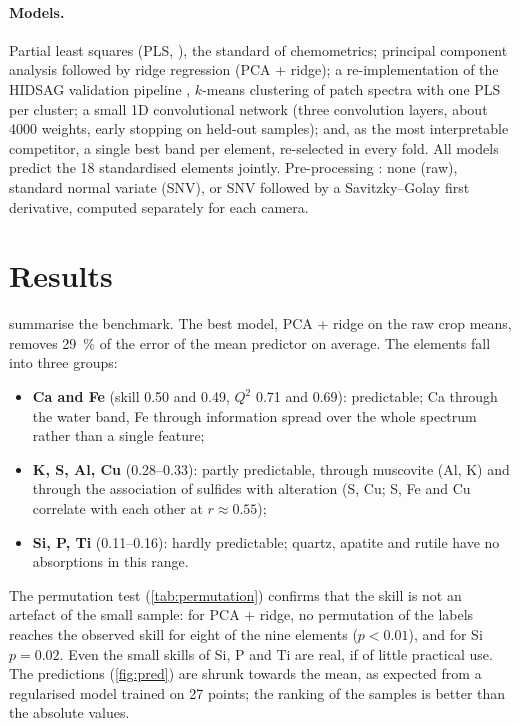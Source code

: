 \documentclass[11pt,a4paper]{article}
\begin{document}
\paragraph{Models.} Partial least squares (PLS, \citealp{Wold2001}), the standard of chemometrics; principal
component analysis followed by ridge regression (PCA + ridge); a re-implementation of the HIDSAG validation pipeline
\citep{Egana2020}, $k$-means clustering of patch spectra with one PLS per cluster; a small 1D convolutional network
(three convolution layers, about \num{4000} weights, early stopping on held-out samples); and, as the most
interpretable competitor, a single best band per element, re-selected in every fold. All models predict the 18
standardised elements jointly. Pre-processing \citep{Rinnan2009}: none (raw), standard normal variate (SNV), or SNV
followed by a Savitzky--Golay first derivative, computed separately for each camera.

\section{Results}\label{sec:results}

 summarise the benchmark. The best model, PCA + ridge on the raw crop means, removes
\SI{29}{\percent} of the error of the mean predictor on average. The elements fall into three groups:
\begin{itemize}
  \item \textbf{Ca and Fe} (skill 0.50 and 0.49, $Q^2$ 0.71 and 0.69): predictable; Ca through the water band,
    Fe through information spread over the whole spectrum rather than a single feature;
  \item \textbf{K, S, Al, Cu} (0.28--0.33): partly predictable, through muscovite (Al, K) and through the
    association of sulfides with alteration (S, Cu; S, Fe and Cu correlate with each other at $r \approx 0.55$);
  \item \textbf{Si, P, Ti} (0.11--0.16): hardly predictable; quartz, apatite and rutile have no absorptions in this
    range.
\end{itemize}
The permutation test (\cref{tab:permutation}) confirms that the skill is not an artefact of the small sample: for
PCA + ridge, no permutation of the labels reaches the observed skill for eight of the nine elements ($p < 0.01$),
and for Si $p = 0.02$. Even the small skills of Si, P and Ti are real, if of little practical use. The predictions (\cref{fig:pred}) are shrunk towards the mean, as expected from a regularised
model trained on 27 points; the ranking of the samples is better than the absolute values.
\end{document}

